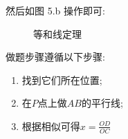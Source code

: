 \documentclass{book}
\begin{document}
    然后如图 5.b 操作即可:
    \begin{figure}[htbp]    %
          \centering            %
          \caption{等和线定理}    %
          \label{fig:subfig_1}            %
        \end{figure}

        做题步骤遵循以下步骤:
        \begin{enumerate}
            \item 找到它们所在位置;
            \item 在$P$点上做$AB$的平行线;
            \item 根据相似可得$\displaystyle x=\frac{OD}{OC}$
        \end{enumerate}
\end{document}
